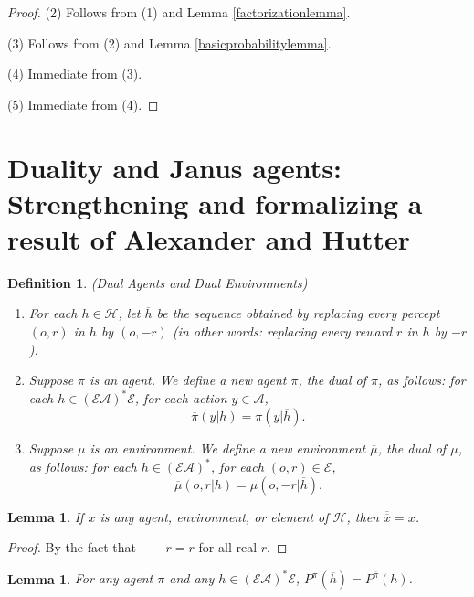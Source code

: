 \documentclass[twoside]{article}
\newtheorem{definition}[theorem]{Definition}
\newtheorem{lemma}[theorem]{Lemma}
\begin{document}
\begin{proof}
    (2) Follows from (1) and Lemma \ref{factorizationlemma}.

    (3) Follows from (2) and Lemma \ref{basicprobabilitylemma}.

    (4) Immediate from (3).

    (5) Immediate from (4).
\end{proof}

\section{Duality and Janus agents:
Strengthening and formalizing a result of Alexander and Hutter}

\begin{definition}
\label{dualagentsdefn}
(Dual Agents and Dual Environments)
\begin{enumerate}
    \item
    For each $h\in\mathcal H$, let $\overline h$ be the sequence obtained
    by replacing every percept $(o,r)$ in $h$ by $(o,-r)$ (in other words:
    replacing every reward $r$ in $h$ by $-r$).
    \item
    Suppose $\pi$ is an agent.
    We define a new agent $\overline \pi$, the \emph{dual} of $\pi$,
    as follows:
    for each $h\in (\mathcal E\mathcal A)^*\mathcal E$,
    for each action $y\in\mathcal A$,
    \[\overline\pi(y|h)=\pi(y|\overline h).\]
    \item
    Suppose $\mu$ is an environment.
    We define a new environment $\overline\mu$, the \emph{dual} of $\mu$,
    as follows:
    for each $h\in (\mathcal E\mathcal A)^*$,
    for each $(o,r)\in\mathcal E$,
    \[\overline\mu(o,r|h)=\mu(o,-r|\overline h).\]
\end{enumerate}
\end{definition}

\begin{lemma}
\label{doublenegationlemma}
    If $x$ is any agent, environment, or element of $\mathcal H$,
    then $\overline{\overline x}=x$.
\end{lemma}

\begin{proof}
    By the fact that $--r=r$ for all real $r$.
\end{proof}

\begin{lemma}
\label{asteriskcommuteswithoverlinelemma}
    For any agent $\pi$ and any $h\in(\mathcal E\mathcal A)^*\mathcal E$,
    $P^\pi(\overline h)=P^{\overline{\pi}}(h)$.
\end{lemma}
\end{document}
